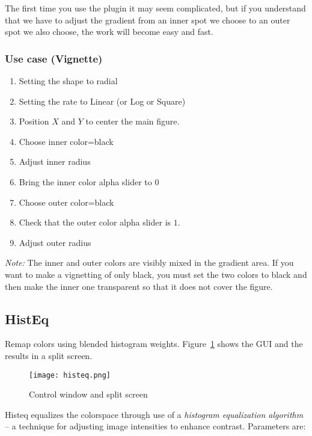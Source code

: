 The first time you use the plugin it may seem complicated, but if you understand that we have to adjust the gradient from an inner spot we choose to an outer spot we also choose, the work will become easy and fast.

\subsubsection*{Use case (Vignette)}
\label{ssub:use_case_vignette}

\begin{enumerate}
    \item Setting the shape to radial
    \item Setting the rate to Linear (or Log or Square)
    \item Position $X$ and $Y$ to center the main figure.
    \item Choose inner color=black
    \item Adjust inner radius
    \item Bring the inner color alpha slider to $0$
    \item Choose outer color=black
    \item Check that the outer color alpha slider is $1$.
    \item Adjust outer radius
\end{enumerate}

\textit{Note:} The inner and outer colors are visibly mixed in the gradient area. If you want to make a vignetting of only black, you must set the two colors to black and then make the inner one transparent so that it does not cover the figure.

\subsection{HistEq}%
\label{sub:histeq}

Remap colors using blended histogram weights. Figure~\ref{fig:histeq} shows the GUI and the results in a split screen.

\begin{figure}[htpb]
    \centering
    \texttt{[image: histeq.png]}
    \caption{Control window and split screen}
    \label{fig:histeq}
\end{figure}

Histeq equalizes the colorspace through use of a \textit{histogram equalization algorithm} -- a technique for adjusting image intensities to enhance contrast. Parameters are:

